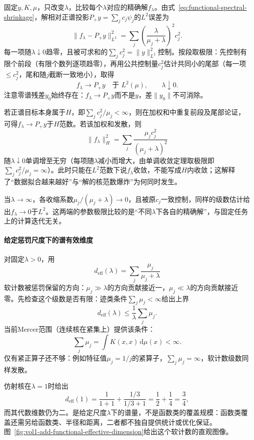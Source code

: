 固定$y,K,\mu$，只改变$\lambda$，比较每个$\lambda$对应的精确解$f_\lambda$。由式~\eqref{eq:functional-spectral-shrinkage}，解相对正谱投影$P_+y=\sum_jc_j\psi_j$的$L^2$误差为
\[
  \|f_\lambda-P_+y\|_{L^2}^2
  =\sum_j\left(\frac{\lambda}{\mu_j+\lambda}\right)^2c_j^2.
\]
每一项随$\lambda\downarrow0$趋零，且被可求和的$\sum_jc_j^2=\|y\|^2_{L^2}$控制。按段取极限：先控制有限个前段（有限个数列逐项趋零），再用公共控制量$c_j^2$估计共同小的尾部（每一项$\le c_j^2$，尾和随$j$截断一致地小），取得
\[
  f_\lambda\to P_+y\quad\text{于 }L^2(\mu),\qquad\lambda\downarrow0.
\]
注意零谱残差$y_0$始终存在：$f_\lambda\to P_+y$而不是$y$，差$\|y_0\|$不可消除。

若正谱目标本身属于$H$，即$\sum_jc_j^2/\mu_j<\infty$，则在加权和中重复前段及尾部论证，可得$f_\lambda\to P_+y$于$H$范数。若该加权和发散，则
\[
  \|f_\lambda\|_H^2
  =\sum_j\frac{\mu_jc_j^2}{(\mu_j+\lambda)^2}
\]
随$\lambda\downarrow0$单调增至无穷（每项随$\lambda$减小而增大，由单调收敛定理取极限即$\sum_jc_j^2/\mu_j=\infty$）。此时只能在$L^2$范数下说$f_\lambda$收敛，不能写成$H$内收敛；这解释了“数据拟合越来越好”与“解的核范数爆炸”为何同时发生。

当$\lambda\to\infty$，各收缩系数$\mu_j/(\mu_j+\lambda)\to0$，且被原$c_j$一致控制，同样的级数估计给出$f_\lambda\to0$于$L^2$。这两端的参数极限比较的是“不同$\lambda$下各自的精确解”，与固定任务上的计算迭代无关。

\paragraph{给定惩罚尺度下的谱有效维度}

对固定$\lambda>0$，用
\begin{equation}
  d_{\mathrm{eff}}(\lambda)=\sum_j\frac{\mu_j}{\mu_j+\lambda}
  \label{eq:functional-effective-dimension}
\end{equation}
软计数被惩罚保留的方向：$\mu_j\gg\lambda$的方向贡献接近一，$\mu_j\ll\lambda$的方向贡献接近零。先检查这个级数是否有限：迹类条件$\sum_j\mu_j<\infty$给出上界
\[
  d_{\mathrm{eff}}(\lambda)\le\frac1\lambda\sum_j\mu_j.
\]
当前Mercer范围（连续核在紧集上）提供该条件：
\[
  \sum_j\mu_j=\int K(x,x)\,\mathrm d\mu(x)<\infty.
\]
仅有紧正算子还不够：例如特征值$\mu_j=1/j$的紧算子，$\sum_j\mu_j=\infty$，软计数级数同样发散。

仿射核在$\lambda=1$时给出
\[
  d_{\mathrm{eff}}(1)=\frac1{1+1}+\frac{1/3}{1/3+1}=\frac12+\frac14=\frac34,
\]
而其代数维数仍为二。是给定尺度$\lambda$下的谱量，不是函数类的覆盖规模：函数类覆盖还需另给函数类、半径和距离，二者都不独自提供统计或优化保证。图~\ref{fig:vol1-add-functional-effective-dimension}给出这个软计数的直观图像。

